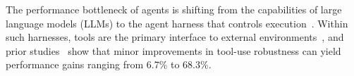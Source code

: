 \documentclass[11pt]{article}
\begin{document}
The performance bottleneck of agents is shifting from the capabilities of large language models (LLMs) to the agent harness that controls execution~\cite{1h,2h,4h}.  
Within such harnesses, tools are the primary interface to external environments~\cite{1,5}, and prior studies~\cite{3h} show that minor improvements in tool-use robustness can yield performance gains ranging from 6.7\% to 68.3\%.

\end{document}
